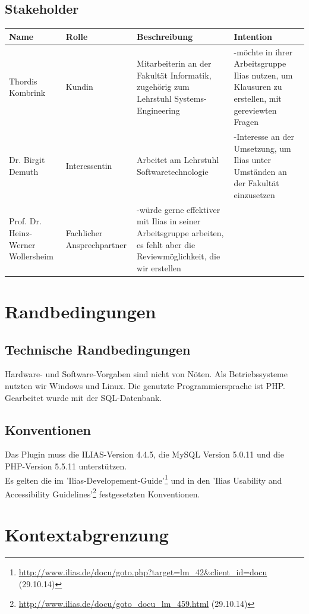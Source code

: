 \documentclass[a4paper]{scrreprt}
\begin{document}
\section{Stakeholder}
\begin{tabular}{|p{2cm}|p{3cm}|p{3cm}|p{4cm}|}\hline
Name & Rolle & Beschreibung & Intention \\\hline
Thordis Kombrink & Kundin & Mitarbeiterin an der Fakultät Informatik, zugehörig zum Lehrstuhl Systems-Engineering & -möchte in ihrer Arbeitsgruppe Ilias nutzen, um Klausuren zu erstellen, mit gereviewten Fragen\\\hline
Dr. Birgit Demuth & Interessentin & Arbeitet am Lehrstuhl Softwaretechnologie & -Interesse an der Umsetzung, um Ilias unter Umständen an der Fakultät einzusetzen\\\hline
Prof. Dr. Heinz-Werner Wollersheim & Fachlicher Ansprechpartner & -würde gerne effektiver mit Ilias in seiner Arbeitsgruppe arbeiten, es fehlt aber die Reviewmöglichkeit, die wir erstellen\\\hline
\end{tabular}
\chapter{Randbedingungen}
\section{Technische Randbedingungen}
Hardware- und Software-Vorgaben sind nicht von Nöten.
Als Betriebssysteme nutzten wir Windows und Linux.
Die genutzte Programmiersprache ist PHP. 
Gearbeitet wurde mit der SQL-Datenbank.
\section{Konventionen} 
Das Plugin muss die ILIAS-Version 4.4.5, die MySQL Version 5.0.11 und die PHP-Version 5.5.11 unterstützen.\\
Es gelten die im 'Ilias-Developement-Guide'\footnote{\url{http://www.ilias.de/docu/goto.php?target=lm_42&client_id=docu} (29.10.14)} und in den 'Ilias Usability and Accessibility Guidelines'\footnote{\url{http://www.ilias.de/docu/goto_docu_lm_459.html} (29.10.14)} festgesetzten Konventionen.
\chapter{Kontextabgrenzung}
\end{document}
